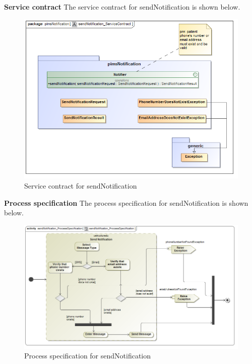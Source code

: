 \begin{description}
		\begin{description}
		\item{\textbf{Service contract}} The service contract for sendNotification is shown below.
		\begin{figure}[H]
		\centerline{\includegraphics[width= 0.7\linewidth]{./Graphics/pimsNotification/sendNotification_ServiceContract}}
			\caption{Service contract for sendNotification }
		\end{figure}
	\end{description}
	\begin{description}
		\item{\textbf{Process specification}} The process specification for sendNotification is shown below.
		\begin{figure}[H]
		\centerline{\includegraphics[width= 0.7\linewidth]{./Graphics/pimsNotification/sendNotification_ProcessSpecification}}
			\caption{Process specification for sendNotification }
		\end{figure}
	\end{description}		
	
\end{description}

